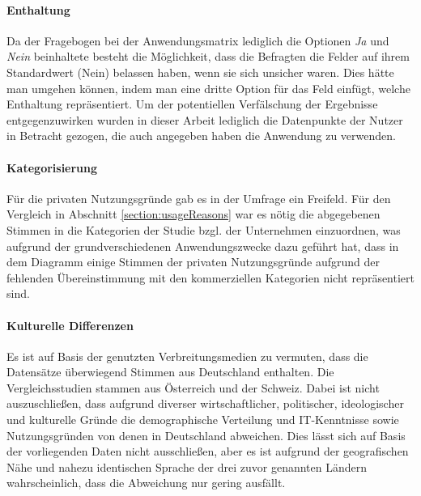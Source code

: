\documentclass[a4paper]{article}
\begin{document}
            \paragraph{Enthaltung}
                Da der Fragebogen bei der Anwendungsmatrix lediglich die Optionen \emph{Ja} und \emph{Nein} beinhaltete besteht die Möglichkeit, dass die Befragten die Felder auf ihrem Standardwert ({\scriptsize Nein}) belassen haben, wenn sie sich unsicher waren. Dies hätte man umgehen können, indem man eine dritte Option für das Feld einfügt, welche Enthaltung repräsentiert. Um der potentiellen Verfälschung der Ergebnisse entgegenzuwirken wurden in dieser Arbeit lediglich die Datenpunkte der Nutzer in Betracht gezogen, die auch angegeben haben die Anwendung zu verwenden.
                
            \paragraph{Kategorisierung}
                Für die privaten Nutzungsgründe gab es in der Umfrage ein Freifeld. Für den Vergleich in Abschnitt \ref{section:usageReasons} war es nötig die abgegebenen Stimmen in die Kategorien der Studie bzgl. der Unternehmen einzuordnen, was aufgrund der grundverschiedenen Anwendungszwecke dazu geführt hat, dass in dem Diagramm einige Stimmen der privaten Nutzungsgründe aufgrund der fehlenden Übereinstimmung mit den kommerziellen Kategorien nicht repräsentiert sind.
                
            \paragraph{Kulturelle Differenzen}
                Es ist auf Basis der genutzten Verbreitungsmedien zu vermuten, dass die Datensätze überwiegend Stimmen aus Deutschland enthalten. Die Vergleichsstudien stammen aus Österreich\cite{demographicDistributionKnowledge} und der Schweiz\cite{oss:studie}. Dabei ist nicht auszuschließen, dass aufgrund diverser wirtschaftlicher, politischer, ideologischer und kulturelle Gründe die demographische Verteilung und IT-Kenntnisse sowie Nutzungsgründen von denen in Deutschland abweichen. Dies lässt sich auf Basis der vorliegenden Daten nicht ausschließen, aber es ist aufgrund der geografischen Nähe und nahezu identischen Sprache der drei zuvor genannten Ländern wahrscheinlich, dass die Abweichung nur gering ausfällt.
                
\end{document}
